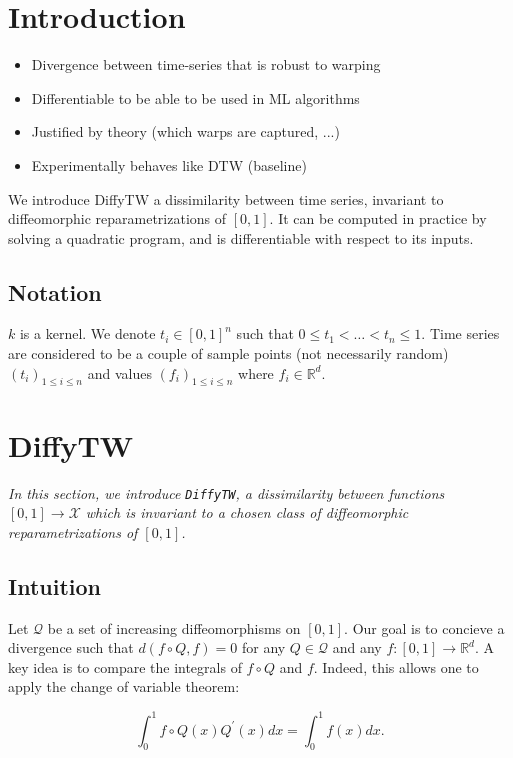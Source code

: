 \section{Introduction}

\begin{itemize}
   \item Divergence between time-series that is robust to warping
   \item Differentiable to be able to be used in ML algorithms
   \item Justified by theory (which warps are captured, ...)
   \item Experimentally behaves like DTW (baseline)
\end{itemize}

We introduce DiffyTW a dissimilarity between time series, invariant to diffeomorphic reparametrizations of $[0,1]$. It can be computed in practice by solving a quadratic program, and is differentiable with respect to its inputs.

\subsection*{Notation}

$k$ is a kernel. We denote $t_i \in [0, 1]^n$ such that $0 \leq t_1 < \ldots < t_n \leq 1$. Time series are considered to be a couple of sample points (not necessarily random) $(t_i)_{1 \leq i \leq n}$ and values $(f_i)_{1\leq i\leq n}$ where $f_i \in\mathbb R^d$.

\section{DiffyTW}
\emph{In this section, we introduce \texttt{DiffyTW}, a dissimilarity between functions $[0,1] \to \mathcal X$ which is invariant to a chosen class of diffeomorphic reparametrizations of $[0,1]$.}

\subsection{Intuition}
Let $\mathcal Q$ be a set of increasing diffeomorphisms on $[0,1]$. Our goal is to concieve a divergence such that $d(f\circ Q, f) = 0$ for any $Q\in\mathcal Q$ and any $f:[0,1] \to \mathbb R^d$. A key idea is to compare the integrals of $f\circ Q$ and $f$. Indeed, this allows one to apply the change of variable theorem:

\begin{equation}
\int_0^1 f\circ Q(x)Q^\prime(x)dx = \int_0^1 f(x)dx.
\end{equation}

